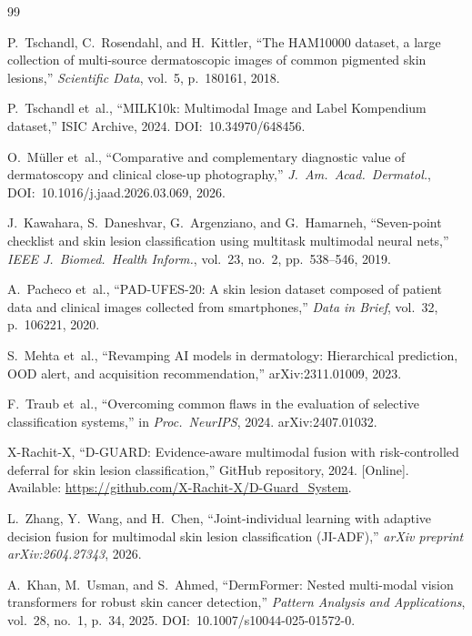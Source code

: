 \documentclass[conference]{IEEEtran}
\newcommand{\1}{\mathbf{1}}
\begin{document}

\begin{thebibliography}{99}

P.~Tschandl, C.~Rosendahl, and H.~Kittler,
``The HAM10000 dataset, a large collection of multi-source dermatoscopic
images of common pigmented skin lesions,''
\emph{Scientific Data}, vol.~5, p.~180161, 2018.

P.~Tschandl et~al.,
``MILK10k: Multimodal Image and Label Kompendium dataset,''
ISIC Archive, 2024. DOI:~10.34970/648456.

O.~M{\"u}ller et~al.,
``Comparative and complementary diagnostic value of dermatoscopy
and clinical close-up photography,''
\emph{J.\ Am.\ Acad.\ Dermatol.}, DOI:~10.1016/j.jaad.2026.03.069, 2026.

J.~Kawahara, S.~Daneshvar, G.~Argenziano, and G.~Hamarneh,
``Seven-point checklist and skin lesion classification using multitask
multimodal neural nets,''
\emph{IEEE J.\ Biomed.\ Health Inform.}, vol.~23, no.~2, pp.~538--546, 2019.

A.~Pacheco et~al.,
``PAD-UFES-20: A skin lesion dataset composed of patient data and
clinical images collected from smartphones,''
\emph{Data in Brief}, vol.~32, p.~106221, 2020.

S.~Mehta et~al.,
``Revamping AI models in dermatology: Hierarchical prediction, OOD alert,
and acquisition recommendation,''
arXiv:2311.01009, 2023.

F.~Traub et~al.,
``Overcoming common flaws in the evaluation of selective classification
systems,''
in \emph{Proc.\ NeurIPS}, 2024. arXiv:2407.01032.

X-Rachit-X,
``D-GUARD: Evidence-aware multimodal fusion with risk-controlled deferral for skin lesion classification,''
GitHub repository, 2024. [Online]. Available: \url{https://github.com/X-Rachit-X/D-Guard_System}.

L.~Zhang, Y.~Wang, and H.~Chen,
``Joint-individual learning with adaptive decision fusion for multimodal skin lesion classification (JI-ADF),''
\emph{arXiv preprint arXiv:2604.27343}, 2026.

A.~Khan, M.~Usman, and S.~Ahmed,
``DermFormer: Nested multi-modal vision transformers for robust skin cancer detection,''
\emph{Pattern Analysis and Applications}, vol.~28, no.~1, p.~34, 2025. DOI:~10.1007/s10044-025-01572-0.


\end{thebibliography}
\end{document}
